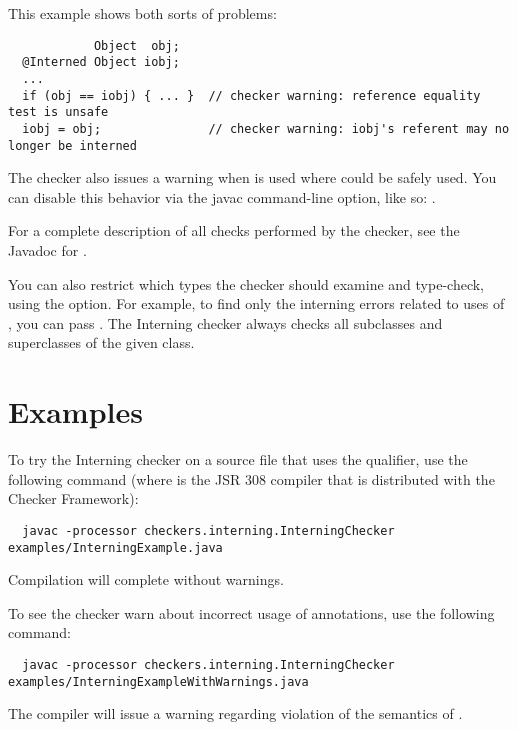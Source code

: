 This example shows both sorts of problems:

\begin{Verbatim}
            Object  obj;
  @Interned Object iobj;
  ...
  if (obj == iobj) { ... }  // checker warning: reference equality test is unsafe
  iobj = obj;               // checker warning: iobj's referent may no longer be interned
\end{Verbatim}

\label{lint-dotequals}

The checker also issues a warning when  is used where
\code{==} could be safely used.  You can disable this behavior via the
javac  command-line option, like so: .

For a complete description of all checks performed by
  the checker, see the Javadoc for
  .

\label{checking-class}
You can also restrict which types the checker should examine and type-check,
using the  option.  For example, to find only the
interning errors related to uses of , you can pass
.  The Interning checker always checks all
subclasses and superclasses of the given class.


\section{Examples\label{interning-example}}

To try the Interning checker on a source file that uses the  qualifier,
use the following command (where  is the JSR 308 compiler that
is distributed with the Checker Framework):

\begin{Verbatim}
  javac -processor checkers.interning.InterningChecker examples/InterningExample.java
\end{Verbatim}

\noindent
Compilation will complete without warnings.

To see the checker warn about incorrect usage of annotations, use the following
command:

\begin{Verbatim}
  javac -processor checkers.interning.InterningChecker examples/InterningExampleWithWarnings.java
\end{Verbatim}

\noindent
The compiler will issue a warning regarding violation of the semantics of
.


